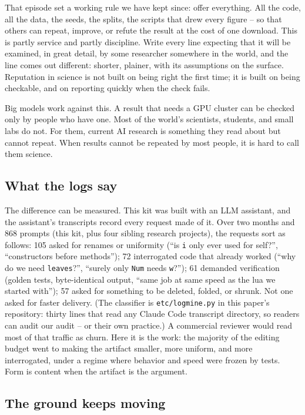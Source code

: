 \documentclass[AMA,STIX2COL]{WileyNJD-v2}
\begin{document}
That episode set a working rule we have kept since: offer
everything.  All the code, all the data, the seeds, the splits, the
scripts that drew every figure -- so that others can repeat,
improve, or refute the result at the cost of one download.  This is
partly service and partly discipline.  Write every line expecting
that it will be examined, in great detail, by some researcher
somewhere in the world, and the line comes out different: shorter,
plainer, with its assumptions on the surface.  Reputation in
science is not built on being right the first time; it is built on
being checkable, and on reporting quickly when the check fails.

Big models work against this.  A result that needs a GPU cluster
can be checked only by people who have one.  Most of the world's
scientists, students, and small labs do not.  For them, current AI
research is something they read about but cannot repeat.  When
results cannot be repeated by most people, it is hard to call them
science.

\subsection{What the logs say}

The difference can be measured.  This kit was built with an LLM
assistant, and the assistant's transcripts record every request
made of it.  Over two months and 868 prompts (this kit, plus four
sibling research projects), the requests sort as follows: 105
asked for renames or uniformity (``is \texttt{i} only ever used
for self?'', ``constructors before methods''); 72 interrogated
code that already worked (``why do we need \texttt{leaves}?'',
``surely only \texttt{Num} needs \texttt{w}?''); 61 demanded
verification (golden tests, byte-identical output, ``same job at
same speed as the lua we started with''); 57 asked for something
to be deleted, folded, or shrunk.  Not one asked for faster
delivery.  (The classifier is \texttt{etc/logmine.py} in this
paper's repository: thirty lines that read any Claude Code
transcript directory, so readers can audit our audit -- or their
own practice.)  A commercial reviewer would read most of that traffic
as churn.  Here it is the work: the majority of the editing budget
went to making the artifact smaller, more uniform, and more
interrogated, under a regime where behavior and speed were frozen
by tests.  Form is content when the artifact is the argument.

\subsection{The ground keeps moving}
\end{document}

